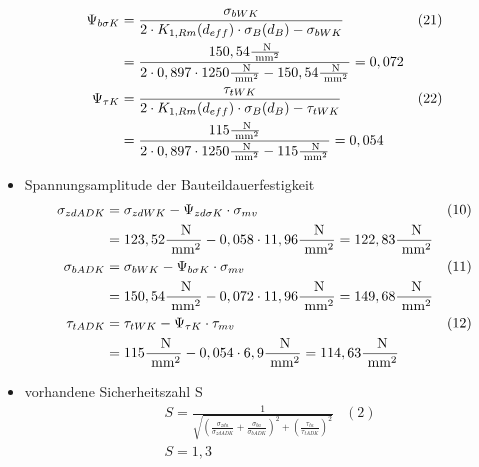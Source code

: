 \begin{itemize}
\begin{align*}
	\Psi_{b \sigma K}&= \frac{\sigma_{bWK}}{2 \cdot  K_{1,Rm} (d_{eff}) \cdot \sigma_B (d_B) -\sigma_{bWK}} &(21) \\
	&=  \frac{150,54 \frac{\text{ N}}{\text{ mm}^2}}{2 \cdot 0,897 \cdot 1250\frac{\text{ N}}{\text{ mm}^2} - 150,54 \frac{\text{ N}}{\text{ mm}^2}} = 0,072 \\
	\Psi_{\tau K}&= \frac{\tau_{tWK}}{2 \cdot  K_{1,Rm} (d_{eff}) \cdot \sigma_B (d_B) -\tau_{tWK}} &(22) \\
	&=  \frac{115 \frac{\text{ N}}{\text{ mm}^2}}{2 \cdot 0,897 \cdot 1250\frac{\text{ N}}{\text{ mm}^2} - 115 \frac{\text{ N}}{\text{ mm}^2}} = 0,054 
	\end{align*}
	\item Spannungsamplitude der Bauteildauerfestigkeit
	\begin{align*}
	\sigma_{zdADK} &= \sigma_{zdWK} - \Psi_{zd \sigma K} \cdot \sigma_{mv} &(10) \\
	&= 123,52\frac{\text{ N}}{\text{ mm}^2} - 0,058 \cdot 11,96 \frac{\text{ N}}{\text{ mm}^2} = 122,83 \frac{\text{ N}}{\text{ mm}^2} \\
	\sigma_{bADK} &= \sigma_{bWK} - \Psi_{b \sigma K} \cdot \sigma_{mv} &(11) \\
	&= 150,54\frac{\text{ N}}{\text{ mm}^2} - 0,072 \cdot 11,96 \frac{\text{ N}}{\text{ mm}^2} = 149,68\frac{\text{ N}}{\text{ mm}^2} \\
	\tau_{tADK} &= \tau_{tWK} - \Psi_{ \tau K} \cdot \tau_{mv} &(12) \\
	&= 115\frac{\text{ N}}{\text{ mm}^2} - 0,054 \cdot6,9 \frac{\text{ N}}{\text{ mm}^2} = 114,63 \frac{\text{ N}}{\text{ mm}^2} 
	\end{align*}
	\item vorhandene Sicherheitszahl S 
	\begin{align*}
	&S= \frac{1}{\sqrt{\left( \frac{\sigma_{zda}}{\sigma_{zdADK}} +\frac{\sigma_{ba}}{\sigma_{bADK}} \right)^2 +\left( \frac{\tau_{ta}}{\tau_{tADK}} \right)^2 }} &(2) \\
	&S=  1,3 
	\end{align*}
\end{itemize}
